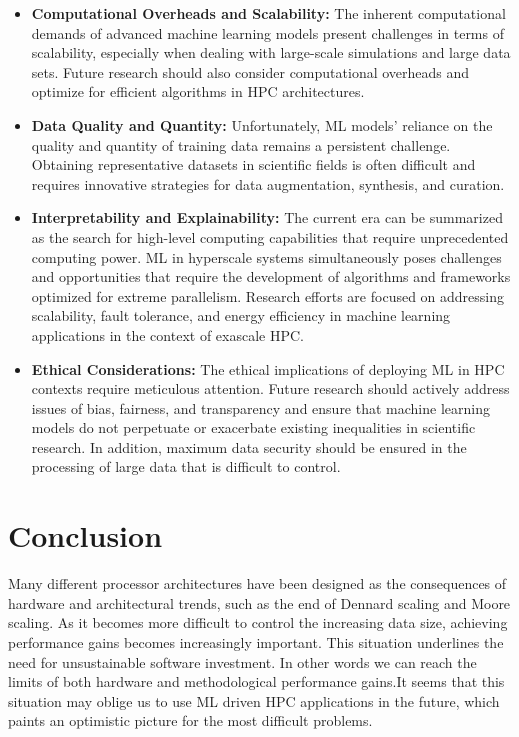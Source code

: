 \documentclass[conference]{IEEEtran}
\begin{document}
\begin{itemize}
\item \textbf{Computational Overheads and Scalability:} The inherent computational demands of advanced machine learning models present challenges in terms of scalability, especially when dealing with large-scale simulations and large data sets. Future research should also consider computational overheads and optimize for efficient algorithms in HPC architectures.
\item \textbf{Data Quality and Quantity:} Unfortunately, ML models' reliance on the quality and quantity of training data remains a persistent challenge. Obtaining representative datasets in scientific fields is often difficult and requires innovative strategies for data augmentation, synthesis, and curation.
\item \textbf{Interpretability and Explainability:} The current era can be summarized as the search for high-level computing capabilities that require unprecedented computing power. ML in hyperscale systems simultaneously poses challenges and opportunities that require the development of algorithms and frameworks optimized for extreme parallelism. Research efforts are focused on addressing scalability, fault tolerance, and energy efficiency in machine learning applications in the context of exascale HPC.
\item \textbf{Ethical Considerations:} The ethical implications of deploying ML in HPC contexts require meticulous attention. Future research should actively address issues of bias, fairness, and transparency and ensure that machine learning models do not perpetuate or exacerbate existing inequalities in scientific research. In addition, maximum data security should be ensured in the processing of large data that is difficult to control.
\end{itemize}


\section{Conclusion}
Many different processor architectures have been designed as the consequences of hardware and architectural trends, such as the end of Dennard scaling and Moore scaling. As it becomes more difficult to control the increasing data size, achieving performance gains becomes increasingly important. This situation underlines the need for unsustainable software investment. In other words we can reach the limits of both hardware and methodological performance gains.It seems that this situation may oblige us to use ML driven HPC applications in the future, which paints an optimistic picture for the most difficult problems.
\end{document}
